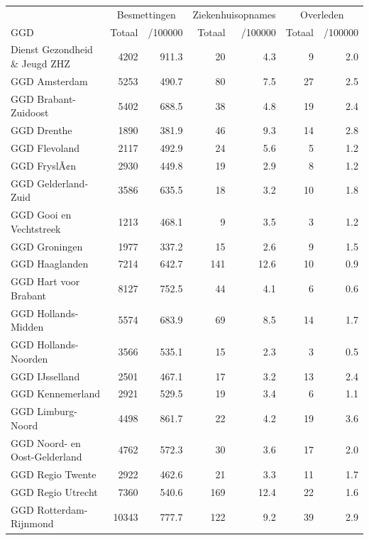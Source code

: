 \documentclass[
  english,
  man,floatsintext]{apa6}
\begin{document}
\begin{table}
\centering\begingroup\fontsize{10}{12}\selectfont

\begin{threeparttable}
\begin{tabular}{lrrrrrr}
\toprule
\multicolumn{1}{c}{ } & \multicolumn{2}{c}{Besmettingen} & \multicolumn{2}{c}{Ziekenhuisopnames} & \multicolumn{2}{c}{Overleden} \\
\cmidrule(l{3pt}r{3pt}){2-3} \cmidrule(l{3pt}r{3pt}){4-5} \cmidrule(l{3pt}r{3pt}){6-7}
GGD & Totaal & /100000 & Totaal & /100000 & Totaal & /100000\\
\midrule
Dienst Gezondheid \& Jeugd ZHZ & 4202 & 911.3 & 20 & 4.3 & 9 & 2.0\\
GGD Amsterdam & 5253 & 490.7 & 80 & 7.5 & 27 & 2.5\\
GGD Brabant-Zuidoost & 5402 & 688.5 & 38 & 4.8 & 19 & 2.4\\
GGD Drenthe & 1890 & 381.9 & 46 & 9.3 & 14 & 2.8\\
GGD Flevoland & 2117 & 492.9 & 24 & 5.6 & 5 & 1.2\\
GGD FryslÃ¢n & 2930 & 449.8 & 19 & 2.9 & 8 & 1.2\\
GGD Gelderland-Zuid & 3586 & 635.5 & 18 & 3.2 & 10 & 1.8\\
GGD Gooi en Vechtstreek & 1213 & 468.1 & 9 & 3.5 & 3 & 1.2\\
GGD Groningen & 1977 & 337.2 & 15 & 2.6 & 9 & 1.5\\
GGD Haaglanden & 7214 & 642.7 & 141 & 12.6 & 10 & 0.9\\
GGD Hart voor Brabant & 8127 & 752.5 & 44 & 4.1 & 6 & 0.6\\
GGD Hollands-Midden & 5574 & 683.9 & 69 & 8.5 & 14 & 1.7\\
GGD Hollands-Noorden & 3566 & 535.1 & 15 & 2.3 & 3 & 0.5\\
GGD IJsselland & 2501 & 467.1 & 17 & 3.2 & 13 & 2.4\\
GGD Kennemerland & 2921 & 529.5 & 19 & 3.4 & 6 & 1.1\\
GGD Limburg-Noord & 4498 & 861.7 & 22 & 4.2 & 19 & 3.6\\
GGD Noord- en Oost-Gelderland & 4762 & 572.3 & 30 & 3.6 & 17 & 2.0\\
GGD Regio Twente & 2922 & 462.6 & 21 & 3.3 & 11 & 1.7\\
GGD Regio Utrecht & 7360 & 540.6 & 169 & 12.4 & 22 & 1.6\\
GGD Rotterdam-Rijnmond & 10343 & 777.7 & 122 & 9.2 & 39 & 2.9\\

\end{tabular}
\end{threeparttable}
\end{table}
\end{document}
